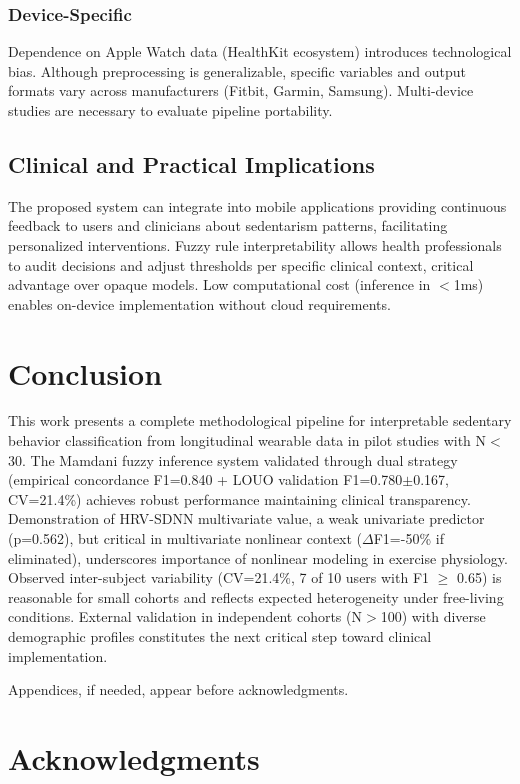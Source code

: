\documentclass[journal,twoside,web]{ieeecolor}
\begin{document}
\subsubsection{Device-Specific}
Dependence on Apple Watch data (HealthKit ecosystem) introduces technological bias. Although preprocessing is generalizable, specific variables and output formats vary across manufacturers (Fitbit, Garmin, Samsung). Multi-device studies are necessary to evaluate pipeline portability.

\subsection{Clinical and Practical Implications}
The proposed system can integrate into mobile applications providing continuous feedback to users and clinicians about sedentarism patterns, facilitating personalized interventions. Fuzzy rule interpretability allows health professionals to audit decisions and adjust thresholds per specific clinical context, critical advantage over opaque models. Low computational cost (inference in $<$1ms) enables on-device implementation without cloud requirements.

\section{Conclusion}
This work presents a complete methodological pipeline for interpretable sedentary behavior classification from longitudinal wearable data in pilot studies with N$<$30. The Mamdani fuzzy inference system validated through dual strategy (empirical concordance F1=0.840 + LOUO validation F1=0.780$\pm$0.167, CV=21.4\%) achieves robust performance maintaining clinical transparency. Demonstration of HRV-SDNN multivariate value, a weak univariate predictor (p=0.562), but critical in multivariate nonlinear context ($\Delta$F1=-50\% if eliminated), underscores importance of nonlinear modeling in exercise physiology. Observed inter-subject variability (CV=21.4\%, 7 of 10 users with F1 $\geq$ 0.65) is reasonable for small cohorts and reflects expected heterogeneity under free-living conditions. External validation in independent cohorts (N$>$100) with diverse demographic profiles constitutes the next critical step toward clinical implementation.

\appendices

Appendices, if needed, appear before acknowledgments.

\section*{Acknowledgments}
\end{document}
